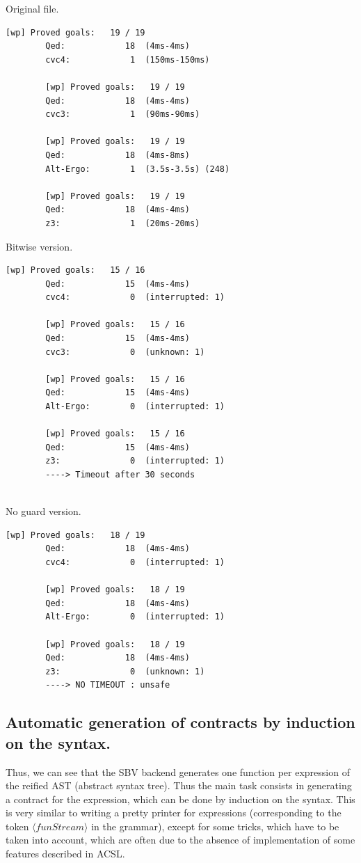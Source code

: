 \documentclass[a4paper,11pt,final]{article}
\begin{document}
	\begin{multicols}{3}
		Original file.
		\begin{lstlisting}[basicstyle=\tiny]
		[wp] Proved goals:   19 / 19
		Qed:            18  (4ms-4ms)
		cvc4:            1  (150ms-150ms)
		
		[wp] Proved goals:   19 / 19
		Qed:            18  (4ms-4ms)
		cvc3:            1  (90ms-90ms)
		
		[wp] Proved goals:   19 / 19
		Qed:            18  (4ms-8ms)
		Alt-Ergo:        1  (3.5s-3.5s) (248)
		
		[wp] Proved goals:   19 / 19
		Qed:            18  (4ms-4ms)
		z3:              1  (20ms-20ms)
		\end{lstlisting}
		\columnbreak
		Bitwise version.
		\begin{lstlisting}[basicstyle=\tiny]
		[wp] Proved goals:   15 / 16
		Qed:            15  (4ms-4ms)
		cvc4:            0  (interrupted: 1)
		
		[wp] Proved goals:   15 / 16
		Qed:            15  (4ms-4ms)
		cvc3:            0  (unknown: 1)
		
		[wp] Proved goals:   15 / 16
		Qed:            15  (4ms-4ms)
		Alt-Ergo:        0  (interrupted: 1)
		
		[wp] Proved goals:   15 / 16
		Qed:            15  (4ms-4ms)
		z3:              0  (interrupted: 1)    
		----> Timeout after 30 seconds
		
		\end{lstlisting}
		\columnbreak
		No guard version.
		\begin{lstlisting}[basicstyle=\tiny]
		[wp] Proved goals:   18 / 19
		Qed:            18  (4ms-4ms)
		cvc4:            0  (interrupted: 1)
		
		[wp] Proved goals:   18 / 19
		Qed:            18  (4ms-4ms)
		Alt-Ergo:        0  (interrupted: 1)
		
		[wp] Proved goals:   18 / 19
		Qed:            18  (4ms-4ms)
		z3:              0  (unknown: 1)   
		----> NO TIMEOUT : unsafe
		\end{lstlisting}
	\end{multicols}
	
	
	\subsection{Automatic generation of contracts by induction on the syntax.}
	
	Thus, we can see that the SBV backend generates one function per expression of the reified AST (abstract syntax tree). Thus the main task consists in generating a contract for the expression, which can be done by induction on the syntax. This is very similar to writing a pretty printer for expressions (corresponding to the token $\langle funStream \rangle$ in the grammar), except for some tricks, which have to be taken into account, which are often due to the absence of implementation of some features described in ACSL.
	
\end{document}
